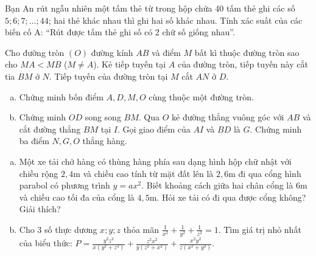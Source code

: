 \begin{ex} %
	Bạn An rút ngẫu nhiên một tấm thẻ từ trong hộp chứa 40 tấm thẻ ghi các số $5; 6; 7; \dots; 44$; hai thẻ khác nhau thì ghi hai số khác nhau. Tính xác suất của các biến cố A: “Rút được tấm thẻ ghi số có 2 chữ số giống nhau”.
\end{ex}
\begin{ex} %
	Cho đường tròn $(O)$ đường kính $AB$ và điểm $M$ bất kì thuộc đường tròn sao cho $MA < MB$ ($M \ne A$). Kẻ tiếp tuyến tại $A$ của đường tròn, tiếp tuyến này cắt tia $BM$ ở $N$. Tiếp tuyến của đường tròn tại $M$ cắt $AN$ ở $D$.
	\begin{enumerate}[a)]
		\item Chứng minh bốn điểm $A, D, M, O$ cùng thuộc một đường tròn.
		\item Chứng minh $OD$ song song $BM$. Qua $O$ kẻ đường thẳng vuông góc với $AB$ và cắt đường thẳng $BM$ tại $I$. Gọi giao điểm của $AI$ và $BD$ là $G$. Chứng minh ba điểm $N, G, O$ thẳng hàng.
	\end{enumerate}
	\loigiai{}
\end{ex}

\begin{ex} %
	\begin{enumerate}[a)]
		\item Một xe tải chở hàng có thùng hàng phía sau dạng hình hộp chữ nhật với chiều rộng $2,4\text{m}$ và chiều cao tính từ mặt đất lên là $2,6\text{m}$ đi qua cổng hình parabol có phương trình $y = ax^2$. Biết khoảng cách giữa hai chân cổng là $6\text{m}$ và chiều cao tối đa của cổng là $4,5\text{m}$. Hỏi xe tải có đi qua được cổng không? Giải thích?
		\item Cho 3 số thực dương $x; y; z$ thỏa mãn $\frac{1}{x^2} + \frac{1}{y^2} + \frac{1}{z^2} = 1$. Tìm giá trị nhỏ nhất của biểu thức:
		$P = \frac{y^2z^2}{x(y^2+z^2)} + \frac{z^2x^2}{y(z^2+x^2)} + \frac{x^2y^2}{z(x^2+y^2)}$.
	\end{enumerate}
	\loigiai{}
\end{ex}

